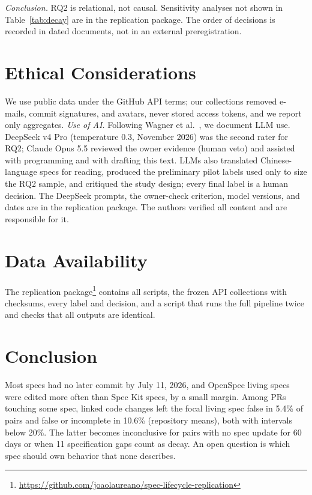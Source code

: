 \documentclass[10pt,conference]{IEEEtran}
\begin{document}
\emph{Conclusion.} RQ2 is relational, not causal. Sensitivity analyses not shown in Table~\ref{tab:decay} are in the replication package. The order of decisions is recorded in dated documents, not in an external preregistration.

\section{Ethical Considerations}
We use public data under the GitHub API terms; our collections removed e-mails, commit signatures, and avatars, never stored access tokens, and we report only aggregates. \emph{Use of AI.} Following Wagner et al.~\cite{wagner2025guidelines}, we document LLM use. DeepSeek v4 Pro (temperature 0.3, November 2026) was the second rater for RQ2; Claude Opus 5.5 reviewed the owner evidence (human veto) and assisted with programming and with drafting this text. LLMs also translated Chinese-language specs for reading, produced the preliminary pilot labels used only to size the RQ2 sample, and critiqued the study design; every final label is a human decision. The DeepSeek prompts, the owner-check criterion, model versions, and dates are in the replication package. The authors verified all content and are responsible for it.

\section{Data Availability}
The replication package\footnote{\url{https://github.com/joaolaureano/spec-lifecycle-replication}} contains all scripts, the frozen API collections with checksums, every label and decision, and a script that runs the full pipeline twice and checks that all outputs are identical.

\section{Conclusion}
Most specs had no later commit by July 11, 2026, and OpenSpec living specs were edited more often than Spec Kit specs, by a small margin. Among PRs touching some spec, linked code changes left the focal living spec false in 5.4\% of pairs and false or incomplete in 10.6\% (repository means), both with intervals below 20\%. The latter becomes inconclusive for pairs with no spec update for 60 days or when 11 specification gaps count as decay. An open question is which spec should own behavior that none describes.



\end{document}
